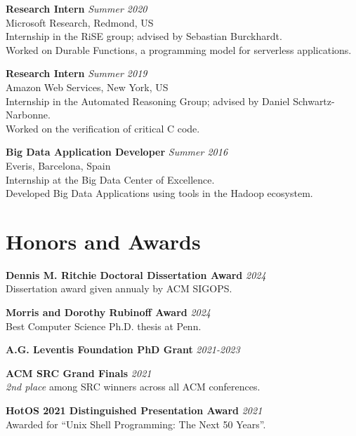 \documentclass[margin]{res}
\begin{document}
\begin{resume}
\textbf{Research Intern} \hfill {\em Summer 2020} \\
Microsoft Research, Redmond, US \\
Internship in the RiSE group; advised by Sebastian Burckhardt. \\
Worked on Durable Functions, a programming model for serverless applications.

\textbf{Research Intern}  \hfill {\em Summer 2019} \\
Amazon Web Services, New York, US \\
Internship in the Automated Reasoning Group; advised by Daniel Schwartz-Narbonne. \\
Worked on the verification of critical C code.


\textbf{Big Data Application Developer}  \hfill {\em Summer 2016} \\
Everis, Barcelona, Spain \\
Internship at the Big Data Center of Excellence. \\
Developed Big Data Applications using tools in the Hadoop ecosystem.

\section{Honors and Awards}
\hypertarget{sec:honors}{}

\textbf{Dennis M. Ritchie Doctoral Dissertation Award} \hfill {\em 2024} \\
Dissertation award given annualy by ACM SIGOPS.

\textbf{Morris and Dorothy Rubinoff Award} \hfill {\em 2024} \\
Best Computer Science Ph.D. thesis at Penn.

\textbf{A.G. Leventis Foundation PhD Grant} \hfill {\em 2021-2023}

\textbf{ACM SRC Grand Finals} \hfill {\em 2021} \\
\textit{2nd place} among SRC winners across all ACM conferences.

\textbf{HotOS 2021 Distinguished Presentation Award} \hfill {\em 2021} \\
Awarded for ``Unix Shell Programming: The Next 50 Years''.


\end{resume}
\end{document}
